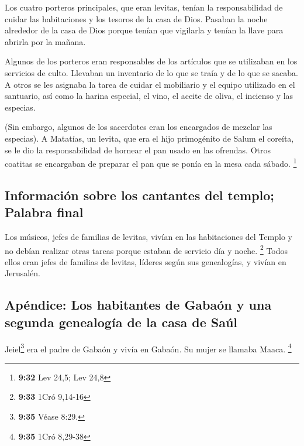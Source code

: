  Los cuatro porteros principales, que eran levitas,
tenían la responsabilidad de cuidar las habitaciones y los tesoros de la
casa de Dios.  Pasaban la noche alrededor de la casa de
Dios porque tenían que vigilarla y tenían la llave para abrirla por la
mañana.

 Algunos de los porteros eran responsables de los
artículos que se utilizaban en los servicios de culto. Llevaban un
inventario de lo que se traía y de lo que se sacaba.  A
otros se les asignaba la tarea de cuidar el mobiliario y el equipo
utilizado en el santuario, así como la harina especial, el vino, el
aceite de oliva, el incienso y las especias.

 (Sin embargo, algunos de los sacerdotes eran los
encargados de mezclar las especias).  A Matatías, un
levita, que era el hijo primogénito de Salum el coreíta, se le dio la
responsabilidad de hornear el pan usado en las ofrendas. 
Otros coatitas se encargaban de preparar el pan que se ponía en la mesa
cada sábado. \footnote{\textbf{9:32} Lev 24,5; Lev 24,8}

\hypertarget{informaciuxf3n-sobre-los-cantantes-del-templo-palabra-final}{%
\subsection{Información sobre los cantantes del templo; Palabra
final}\label{informaciuxf3n-sobre-los-cantantes-del-templo-palabra-final}}

 Los músicos, jefes de familias de levitas, vivían en las
habitaciones del Templo y no debían realizar otras tareas porque estaban
de servicio día y noche. \footnote{\textbf{9:33} 1Cró 9,14-16}
 Todos ellos eran jefes de familias de levitas, líderes
según sus genealogías, y vivían en Jerusalén.

\hypertarget{apuxe9ndice-los-habitantes-de-gabauxf3n-y-una-segunda-genealoguxeda-de-la-casa-de-sauxfal}{%
\subsection{Apéndice: Los habitantes de Gabaón y una segunda genealogía
de la casa de
Saúl}\label{apuxe9ndice-los-habitantes-de-gabauxf3n-y-una-segunda-genealoguxeda-de-la-casa-de-sauxfal}}

 Jeiel\footnote{\textbf{9:35} Véase 8:29.} era el padre
de Gabaón y vivía en Gabaón. Su mujer se llamaba Maaca. \footnote{\textbf{9:35}
  1Cró 8,29-38}

